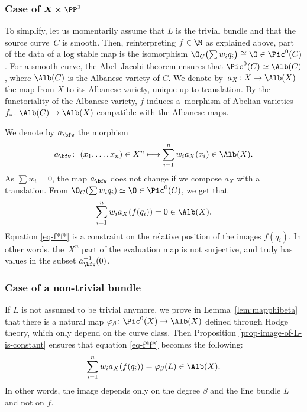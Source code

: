 \subsubsection[Case of X times P\^{}1]{Case of $\boldsymbol{ X\times\PP^1}$}


To simplify, let us momentarily assume that $L$ is the trivial bundle and that the source curve~$C$ is smooth.
 Then, reinterpreting $f\in\M$ as explained above, part of the data of a log stable map is the isomorphism
$
\O_C\bigl(\sum w_iq_i\bigr)\cong\O\in\Pic^0(C)$.
For a smooth curve, the Abel--Jacobi theorem ensures that $\Pic^0(C)\simeq\Alb(C)$, where $\Alb(C)$ is the Albanese variety of $C$.
 We denote by~${a_X\colon X\to\Alb(X)}$ the map from $X$ to its Albanese variety, unique up to translation. By the functoriality of the Albanese variety, $f$ induces a~morphism of Abelian varieties
$
 f_*\colon \Alb(C)\to\Alb(X)
$ compatible with the Albanese maps.

We denote by $a_\bfw$ the morphism
\[
 a_\bfw\colon\ (x_1,\dots,x_n)\in X^n\longmapsto \sum_{i=1}^n w_i a_X(x_i)\in\Alb(X).
 \]
As $\sum w_i=0$, the map $a_\bfw$ does not change if we compose $a_X$ with a translation. From $\O_C(\sum w_iq_i)\simeq\O\in\Pic^0(C)$, we get that
\begin{equation}\label{eq-f*f*}
 \sum_{i=1}^n w_i a_X(f(q_i)) =0\in\Alb(X).
\end{equation}
Equation \eqref{eq-f*f*} is a constraint on the relative position of the images $f(q_i)$. In other words, the~$X^n$ part of the evaluation map is not surjective, and truly has values in the subset $a_\bfw^{-1}(0)$.


\subsubsection{Case of a non-trivial bundle} If $L$ is not assumed to be trivial anymore, we prove in Lemma~\ref{lem:mapphibeta} that there is a natural map $\varphi_\beta\colon \Pic^0(X)\to\Alb(X)$ defined through Hodge theory, which only depend on the curve class. Then
Proposition \ref{prop-image-of-L-is-constant} ensures that equation \eqref{eq-f*f*} becomes the following:
\begin{equation}\label{eq-f*f*L}
\sum_{i=1}^n w_ia_X(f(q_i)) = \varphi_\beta(L)\in\Alb(X).
\end{equation}
In other words, the image depends only on the degree $\beta$ and the line bundle $L$ and not on $f$.

